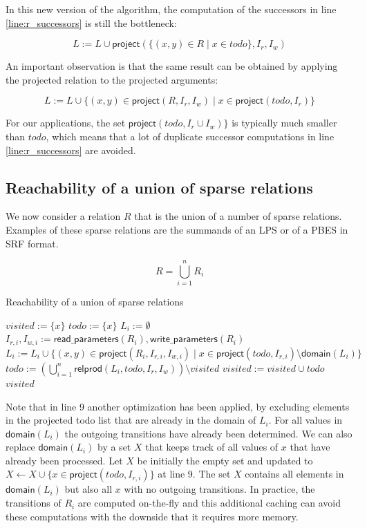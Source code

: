 \documentclass{article}
\newcommand{\var}[1]{\ensuremath{\textit{#1}}}
\begin{document}
\noindent
In this new version of the algorithm, the computation of the successors in line \ref{line:r_successors} is still the bottleneck:

\[
L := L \cup \textsf{project}(\{ (x,y) \in R \mid x \in \var{todo} \}, I_r, I_w)
\]

\noindent
An important observation is that the same result can be obtained by applying the projected relation to the projected arguments:

\[
L := L \cup \{ (x,y) \in \textsf{project}(R, I_r, I_w) \mid x \in \textsf{project}(\var{todo}, I_r) \}
\]

\noindent
For our applications, the set $\textsf{project}(\var{todo}, I_r \cup I_w) \}$ is typically much smaller than $\var{todo}$, which means that a lot of duplicate successor computations in line \ref{line:r_successors} are avoided.

\newpage
\subsection{Reachability of a union of sparse relations}

We now consider a relation $R$ that is the union of a number of sparse relations. Examples of these sparse relations are the summands of an LPS or of a PBES in SRF format.

\[
R = \bigcup_{i=1}^{n} R_i
\]

\begin{algorithm}[h]
\caption{Reachability of a union of sparse relations}
\label{alg:reachability4}
\begin{algorithmic}[1]
\State $\var{visited} := \{ x \}$
\State $\var{todo} := \{ x \}$
    \State $L_i := \emptyset$
    \State $I_{r,i}, I_{w,i} := \textsf{read\_parameters}(R_i), \textsf{write\_parameters}(R_i)$
\EndFor
\While {$\var{todo} \neq \emptyset$}
        \State $L_i := L_i \cup \{ (x,y) \in \textsf{project}(R_i, I_{r,i}, I_{w,i}) \mid x \in \textsf{project}(\var{todo}, I_{r,i})  \setminus \textsf{domain}(L_i) \}$
    \EndFor
    \State $\var{todo} := \left( \bigcup\limits_{i=1}^n \textsf{relprod}(L_i, \var{todo}, I_r, I_w) \right) \setminus \var{visited}$
    \State $\var{visited} := \var{visited} \cup \var{todo}$
\EndWhile
\State \Return \var{visited}
\EndFunction
\end{algorithmic}
\end{algorithm}
\noindent
Note that in line 9 another optimization has been applied, by excluding elements in the projected todo list that are already in the domain of $L_i$.
For all values in $\textsf{domain}(L_i)$ the outgoing transitions have already been determined.
We can also replace $\textsf{domain}(L_i)$ by a set $X$ that keeps track of all values of $x$ that have already been processed.
Let $X$ be initially the empty set and updated to $X \gets X \cup \{x \in \textsf{project}(\var{todo}, I_{r,i})\}$ at line 9.
The set $X$ contains all elements in $\textsf{domain}(L_i)$ but also all $x$ with no outgoing transitions.
In practice, the transitions of $R_i$ are computed on-the-fly and this additional caching can avoid these computations with the downside that it requires more memory.
\end{document}
